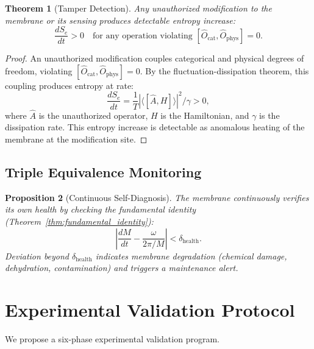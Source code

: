 \documentclass[12pt]{article}
\newtheorem{theorem}{Theorem}[section]
\newtheorem{proposition}[theorem]{Proposition}
\theoremstyle{definition}
\theoremstyle{remark}
\newcommand{\Se}{S_e}
\newcommand{\Ocat}{\hat{O}_{\mathrm{cat}}}
\newcommand{\Ophys}{\hat{O}_{\mathrm{phys}}}
\begin{document}
\begin{theorem}[Tamper Detection]
\label{thm:tamper}
Any unauthorized modification to the membrane or its sensing produces detectable entropy increase:
\begin{equation}
  \frac{d\Se}{dt} > 0 \quad \text{for any operation violating } [\Ocat, \Ophys] = 0.
  \label{eq:tamper}
\end{equation}
\end{theorem}

\begin{proof}
An unauthorized modification couples categorical and physical degrees of freedom, violating $[\Ocat, \Ophys] = 0$. By the fluctuation-dissipation theorem, this coupling produces entropy at rate:
\begin{equation}
  \frac{d\Se}{dt} = \frac{1}{T}|\langle[\hat{A}, H]\rangle|^2 / \gamma > 0,
  \label{eq:tamper_proof}
\end{equation}
where $\hat{A}$ is the unauthorized operator, $H$ is the Hamiltonian, and $\gamma$ is the dissipation rate. This entropy increase is detectable as anomalous heating of the membrane at the modification site.
\end{proof}

\subsection{Triple Equivalence Monitoring}

\begin{proposition}[Continuous Self-Diagnosis]
\label{prop:self_diagnosis}
The membrane continuously verifies its own health by checking the fundamental identity (Theorem~\ref{thm:fundamental_identity}):
\begin{equation}
  \left|\frac{dM}{dt} - \frac{\omega}{2\pi/M}\right| < \delta_{\mathrm{health}}.
  \label{eq:self_diagnosis}
\end{equation}
Deviation beyond $\delta_{\mathrm{health}}$ indicates membrane degradation (chemical damage, dehydration, contamination) and triggers a maintenance alert.
\end{proposition}


\section{Experimental Validation Protocol}
\label{sec:validation}

We propose a six-phase experimental validation program.
\end{document}
